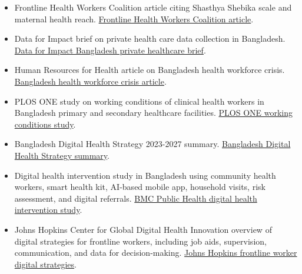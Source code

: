 \documentclass[11pt,letterpaper]{article}
\begin{document}
\begin{itemize}
  \item Frontline Health Workers Coalition article citing Shasthya Shebika scale and maternal health reach. \href{https://www.frontlinehealthworkers.org/blog/weve-made-staggering-progress-maternal-health-bangladesh-where-next}{Frontline Health Workers Coalition article}.
  \item Data for Impact brief on private health care data collection in Bangladesh. \href{https://www.data4impactproject.org/wp-content/uploads/2021/05/Improving-Private-Health-Care-Data-Collection_fs-21-517_d4i-1.pdf}{Data for Impact Bangladesh private healthcare brief}.
  \item Human Resources for Health article on Bangladesh health workforce crisis. \href{https://pmc.ncbi.nlm.nih.gov/articles/PMC3037300/}{Bangladesh health workforce crisis article}.
  \item PLOS ONE study on working conditions of clinical health workers in Bangladesh primary and secondary healthcare facilities. \href{https://journals.plos.org/plosone/article?id=10.1371/journal.pone.0294224}{PLOS ONE working conditions study}.
  \item Bangladesh Digital Health Strategy 2023-2027 summary. \href{https://dig.watch/resource/the-bangladesh-digital-health-strategy-2023-2027}{Bangladesh Digital Health Strategy summary}.
  \item Digital health intervention study in Bangladesh using community health workers, smart health kit, AI-based mobile app, household visits, risk assessment, and digital referrals. \href{https://link.springer.com/article/10.1186/s12889-025-22770-9}{BMC Public Health digital health intervention study}.
  \item Johns Hopkins Center for Global Digital Health Innovation overview of digital strategies for frontline workers, including job aids, supervision, communication, and data for decision-making. \href{https://publichealth.jhu.edu/center-for-global-digital-health-innovation/digital-strategies-for-frontline-workers-delivering-child-health}{Johns Hopkins frontline worker digital strategies}.
\end{itemize}
\end{document}
